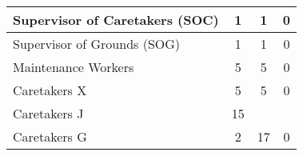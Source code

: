 \begin{tabular}{l|c|c|c|}
        \multicolumn{1}{|l|}{\cellcolor{ccfuschialight}Supervisor of Caretakers (SOC)} & 1                                                      & 1                                                                & 0                                                      \\ \hline
        \multicolumn{1}{|l|}{\cellcolor{ccfuschialight}Supervisor of Grounds (SOG)}    & 1                                                      & 1                                                                & 0                                                      \\ \hline
        \multicolumn{1}{|l|}{\cellcolor{ccfuschialight}Maintenance Workers}            & 5                                                      & 5                                                                & 0                                                       \\ \hline
        \multicolumn{1}{|l|}{\cellcolor{ccfuschialight}Caretakers X}                   & 5                                                      & 5                                                                & 0                                                      \\ \hline
        \multicolumn{1}{|l|}{\cellcolor{ccfuschialight}Caretakers J\tnote{1}}                   & 15                                                      &                                                                 &                                                         \\ \cline{1-2}
        \multicolumn{1}{|l|}{\cellcolor{ccfuschialight}Caretakers G}                   & 2                                                      & \multirow{-2}{*}{17}                                     & \multirow{-2}{*}{0}                           \\ \hline
        \end{tabular}
        
        